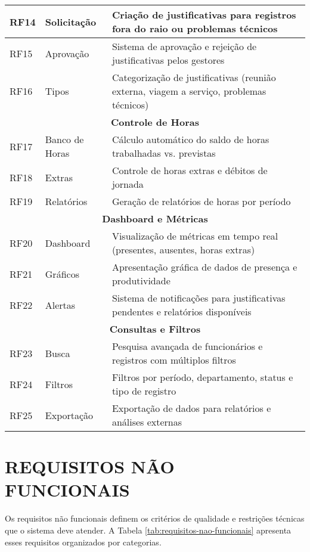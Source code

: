 \begin{table}[!htbp]
\begin{tabular}{|p{}|p{}|p{}|}
\hline
RF14 & Solicitação & Criação de justificativas para registros fora do raio ou problemas técnicos \\
\hline
RF15 & Aprovação & Sistema de aprovação e rejeição de justificativas pelos gestores \\
\hline
RF16 & Tipos & Categorização de justificativas (reunião externa, viagem a serviço, problemas técnicos) \\
\hline
\multicolumn{3}{|c|}{\textbf{Controle de Horas}} \\
\hline
RF17 & Banco de Horas & Cálculo automático do saldo de horas trabalhadas vs. previstas \\
\hline
RF18 & Extras & Controle de horas extras e débitos de jornada \\
\hline
RF19 & Relatórios & Geração de relatórios de horas por período \\
\hline
\multicolumn{3}{|c|}{\textbf{Dashboard e Métricas}} \\
\hline
RF20 & Dashboard & Visualização de métricas em tempo real (presentes, ausentes, horas extras) \\
\hline
RF21 & Gráficos & Apresentação gráfica de dados de presença e produtividade \\
\hline
RF22 & Alertas & Sistema de notificações para justificativas pendentes e relatórios disponíveis \\
\hline
\multicolumn{3}{|c|}{\textbf{Consultas e Filtros}} \\
\hline
RF23 & Busca & Pesquisa avançada de funcionários e registros com múltiplos filtros \\
\hline
RF24 & Filtros & Filtros por período, departamento, status e tipo de registro \\
\hline
RF25 & Exportação & Exportação de dados para relatórios e análises externas \\
\hline
\end{tabular}
\end{table}

\section{REQUISITOS NÃO FUNCIONAIS}

Os requisitos não funcionais definem os critérios de qualidade e restrições técnicas que o sistema deve atender. A Tabela \ref{tab:requisitos-nao-funcionais} apresenta esses requisitos organizados por categorias.

